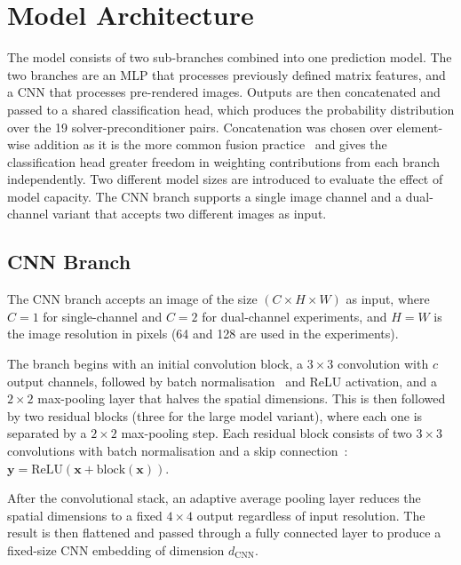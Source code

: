 \section{Model Architecture}\label{sec:architecture}

The model consists of two sub-branches combined into one prediction model.
The two branches are an MLP that processes previously defined matrix features, and a CNN that processes pre-rendered images.
Outputs are then concatenated and passed to a shared classification head, which produces the probability distribution over the 19 solver-preconditioner pairs.
Concatenation was chosen over element-wise addition as it is the more common fusion practice~\cite{baltruvsaitis2018multimodal} and gives the classification head greater freedom in weighting contributions from each branch independently.
Two different model sizes are introduced to evaluate the effect of model capacity.
The CNN branch supports a single image channel and a dual-channel variant that accepts two different images as input.

\subsection{CNN Branch}\label{subsec:cnn-branch}

The CNN branch accepts an image of the size $(C \times H \times W)$ as input,
where  $C = 1$ for single-channel and $C = 2$ for dual-channel experiments,
and $H = W$ is the image resolution in pixels (64 and 128 are used in the experiments).

The branch begins with an initial convolution block, a $3 \times 3$ convolution with
$c$ output channels, followed by batch normalisation~\cite{ioffe2015batch} and ReLU activation, and a
$2 \times 2$ max-pooling layer that halves the spatial dimensions.
This is then followed by two residual blocks (three for the large model variant),
where each one is separated by a $2 \times 2$ max-pooling step.
Each residual block consists of two $3 \times 3$ convolutions with batch normalisation
and a skip connection~\cite{he2016deep}: $\mathbf{y} = \text{ReLU}(\mathbf{x} + \text{block}(\mathbf{x}))$.

After the convolutional stack, an adaptive average pooling layer reduces the spatial
dimensions to a fixed $4 \times 4$ output regardless of input resolution.
The result is then flattened and passed through a fully connected layer to produce a
fixed-size CNN embedding of dimension $d_{\text{CNN}}$.

